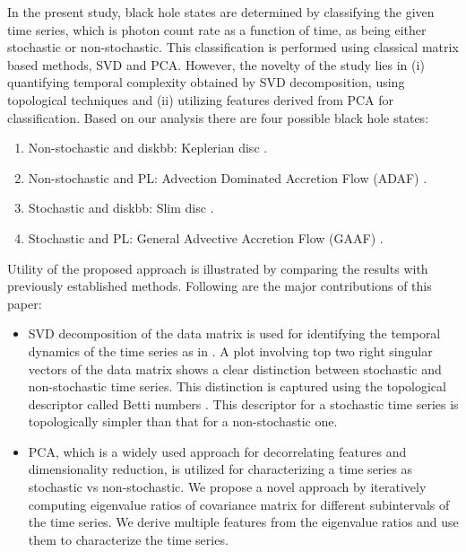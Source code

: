 \documentclass[10pt,conference]{IEEEtran}
\begin{document}
In the present study, black hole states are determined by  classifying the given time series, which is photon count rate as a function of time,  as being either stochastic or non-stochastic. This classification is performed using classical matrix based methods, SVD and PCA.
However, the novelty of the study lies in (i) quantifying temporal complexity obtained by SVD decomposition, using topological techniques and (ii) utilizing features derived from PCA for classification. Based on our analysis there are four possible black hole states:
\begin{enumerate}
 \item Non-stochastic and diskbb: Keplerian disc \cite{Shakura1973}.
 \item Non-stochastic and PL: Advection Dominated Accretion Flow (ADAF)  \cite{narayan1994}.
 \item Stochastic and diskbb: Slim disc \cite{Abramowicz1988}.
 \item Stochastic and PL: General Advective Accretion Flow (GAAF) \cite{chakrabarti1995, rajesh2010}.
\end{enumerate}

Utility of the proposed approach is illustrated by comparing the results with previously established methods. Following are the major contributions of this paper:
\begin{itemize}
 \item SVD decomposition of the data matrix is used for identifying the temporal dynamics of the time series as in \cite{misra2006}. A plot involving top two right singular vectors of the data matrix shows a clear distinction between stochastic and non-stochastic time series. This distinction is captured using the topological descriptor called Betti numbers \cite{jmlr}. This descriptor for a stochastic time series is topologically simpler than that for a non-stochastic one.

 \item PCA, which is a widely used approach for decorrelating features and dimensionality reduction, is utilized for characterizing a time series as stochastic vs non-stochastic. We propose a novel approach by iteratively computing eigenvalue ratios  of covariance matrix for different subintervals of the time series. We  derive multiple features from the eigenvalue ratios and use them to characterize the time series.
\end{itemize}
\end{document}
